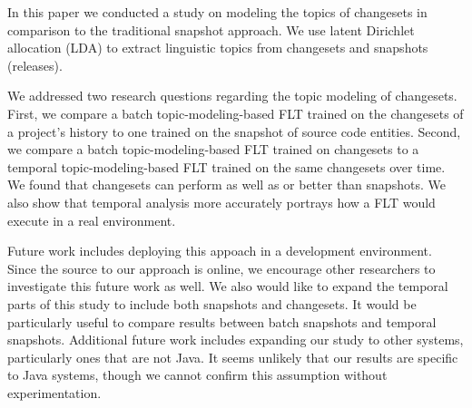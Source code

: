 
In this paper we conducted a study on modeling the topics of changesets in comparison to the traditional snapshot approach.
We use latent Dirichlet allocation (LDA) to extract linguistic topics from
changesets and snapshots (releases).

We addressed two research questions regarding the topic modeling of changesets.
First, we compare a batch topic-modeling-based FLT trained on the changesets
of a project's history to one trained on the snapshot of source code entities.
Second, we compare a batch topic-modeling-based FLT trained on changesets
to a temporal topic-modeling-based FLT trained on the same changesets over time.
We found that changesets can perform as well as or better than snapshots.
We also show that temporal analysis more accurately portrays how a FLT would execute in a real environment.


Future work includes deploying this appoach in a development environment.
Since the source to our approach is online, we encourage other researchers
to investigate this future work as well.
We also would like to expand the temporal parts of this study to include
both snapshots and changesets.
It would be particularly useful to compare results between batch snapshots and temporal snapshots.
Additional future work includes expanding our study to other systems,
particularly ones that are not Java.
It seems unlikely that our results are specific to Java systems,
though we cannot confirm this assumption without experimentation.


